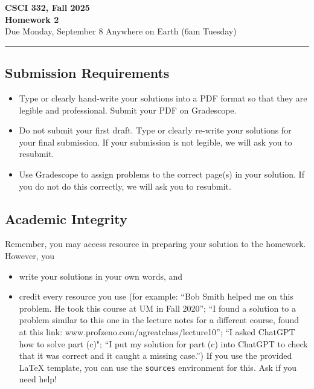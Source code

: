 \documentclass[11pt]{article}
\begin{document}
\begin{center}
\Large\textbf{CSCI 332, Fall 2025}%
\\
\LARGE\textbf{Homework 2}%
\\[0.5ex]
\large Due Monday, September 8 Anywhere on Earth (6am Tuesday)
\end{center}

\bigskip
\hrule
\bigskip

\subsection*{Submission Requirements}
\begin{itemize}
    \item Type or clearly hand-write your solutions into a PDF format so that they are legible and professional. Submit your PDF on Gradescope. 
    \item Do not submit your first draft. Type or clearly re-write your solutions for your final submission. If your submission is not legible, we will ask you to resubmit.
    \item Use Gradescope to assign problems to the correct page(s) in your solution. If you do not do this correctly, we will ask you to resubmit.
\end{itemize}

\subsection*{Academic Integrity}

Remember, you may access  resource in preparing your solution to the homework. However, you 
\begin{itemize}
    \item write your solutions in your own words, and
    \item credit every resource you use (for example: ``Bob Smith helped me on
    this problem. He took this course at UM in Fall 2020''; ``I found a solution
    to a problem similar to this one in the lecture notes for a different
    course, found at this link: www.profzeno.com/agreatclass/lecture10''; ``I
    asked ChatGPT how to solve  part (c)"; ``I put my solution for part (c) into
    ChatGPT to check that it was correct and it caught a missing case.'') If you
    use the provided LaTeX template, you can use the \texttt{sources}
    environment for this. Ask if you need help!
\end{itemize}
\end{document}
